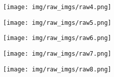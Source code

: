 \begin{figure}[!htbp]
\begin{subfigure}{.47\textwidth}
  \centering
  \texttt{[image: img/raw\_imgs/raw4.png]}  
  \label{fig:005}
\end{subfigure}
\begin{subfigure}{.47\textwidth}
  \centering
  \texttt{[image: img/raw\_imgs/raw5.png]}  
  \label{fig:006}
\end{subfigure}
\label{005}
\end{figure}

\begin{figure}[!htbp]
\begin{subfigure}{.47\textwidth}
  \centering
  \texttt{[image: img/raw\_imgs/raw6.png]}  
  \label{fig:005}
\end{subfigure}
\begin{subfigure}{.47\textwidth}
  \centering
  \texttt{[image: img/raw\_imgs/raw7.png]}  
  \label{fig:006}
\end{subfigure}
\label{005}
\end{figure}

\newpage 
\begin{figure}[!htbp]
\begin{subfigure}{1.0\textwidth}
  \centering
  \texttt{[image: img/raw\_imgs/raw8.png]}  
  \label{fig:005}
\end{subfigure}
\label{005}
\end{figure}
